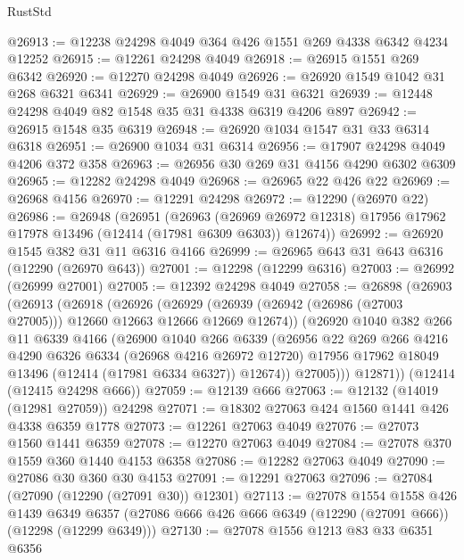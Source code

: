 \begin{lexlean}{RustStd}
\begin{coremodule}
{\begin{coremodule}
{{{{{{{{{{{{{{{{{{{{{{{{{{{{{{{{{{{{{{{{{{{{{{{{{{@26913 := @12238 @24298 @4049 @364 @426 @1551 @269 @4338 @6342 @4234 @12252
@26915 := @12261 @24298 @4049
@26918 := @26915 @1551 @269 @6342
@26920 := @12270 @24298 @4049
@26926 := @26920 @1549 @1042 @31 @268 @6321 @6341
@26929 := @26900 @1549 @31 @6321
@26939 := @12448 @24298 @4049 @82 @1548 @35 @31 @4338 @6319 @4206 @897
@26942 := @26915 @1548 @35 @6319
@26948 := @26920 @1034 @1547 @31 @33 @6314 @6318
@26951 := @26900 @1034 @31 @6314
@26956 := @17907 @24298 @4049 @4206 @372 @358
@26963 := @26956 @30 @269 @31 @4156 @4290 @6302 @6309
@26965 := @12282 @24298 @4049
@26968 := @26965 @22 @426 @22
@26969 := @26968 @4156
@26970 := @12291 @24298
@26972 := @12290 (@26970 @22)
@26986 := @26948
    (@26951
      (@26963
        (@26969 @26972 @12318)
        @17956
        @17962
        @17978
        @13496
        (@12414 (@17981 @6309 @6303))
        @12674))
@26992 := @26920 @1545 @382 @31 @11 @6316 @4166
@26999 := @26965 @643 @31 @643 @6316 (@12290 (@26970 @643))
@27001 := @12298 (@12299 @6316)
@27003 := @26992 (@26999 @27001)
@27005 := @12392 @24298 @4049
@27058 := @26898
    (@26903
      (@26913
        (@26918
          (@26926
            (@26929 (@26939 (@26942 (@26986 (@27003 @27005))) @12660 @12663 @12666 @12669 @12674))
            (@26920
              @1040
              @382
              @266
              @11
              @6339
              @4166
              (@26900
                @1040
                @266
                @6339
                (@26956
                  @22
                  @269
                  @266
                  @4216
                  @4290
                  @6326
                  @6334
                  (@26968 @4216 @26972 @12720)
                  @17956
                  @17962
                  @18049
                  @13496
                  (@12414 (@17981 @6334 @6327))
                  @12674))
              @27005)))
        @12871))
    (@12414 (@12415 @24298 @666))
@27059 := @12139 @666
@27063 := @12132 (@14019 (@12981 @27059)) @24298
@27071 := @18302 @27063 @424 @1560 @1441 @426 @4338 @6359 @1778
@27073 := @12261 @27063 @4049
@27076 := @27073 @1560 @1441 @6359
@27078 := @12270 @27063 @4049
@27084 := @27078 @370 @1559 @360 @1440 @4153 @6358
@27086 := @12282 @27063 @4049
@27090 := @27086 @30 @360 @30 @4153
@27091 := @12291 @27063
@27096 := @27084 (@27090 (@12290 (@27091 @30)) @12301)
@27113 := @27078
    @1554
    @1558
    @426
    @1439
    @6349
    @6357
    (@27086 @666 @426 @666 @6349 (@12290 (@27091 @666)) (@12298 (@12299 @6349)))
@27130 := @27078
    @1556
    @1213
    @83
    @33
    @6351
    @6356
}}}}}}}}}}}}}}}}}}}}}}}}}}}}}}}}}}}}}}}}}}}}}}}}}}
\end{coremodule}}
\end{coremodule}
\end{lexlean}
